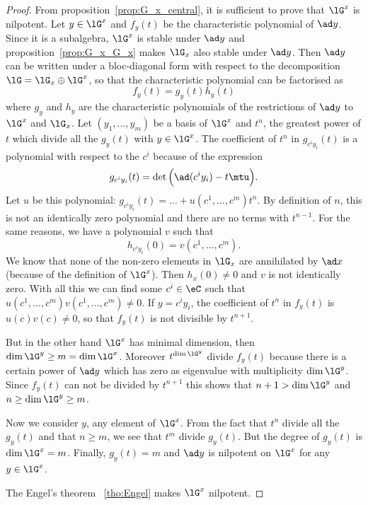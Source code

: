 \begin{proof}
	From proposition~\ref{prop:G_x_central}, it is sufficient to prove that $\lG^x$ is nilpotent. Let $y\in\lG^x$ and $f_y(t)$ be the characteristic polynomial of $\ad y$. Since it is a subalgebra, $\lG^x$ is stable under $\ad y$ and proposition~\ref{prop:G_x_G_x} makes $\lG_x$ also stable under $\ad y$. Then $\ad y$ can be written under a bloc-diagonal form with respect to the decomposition $\lG=\lG_x\oplus\lG^x$, so that the characteristic polynomial can be factorised as
	\begin{equation}
		f_y(t)=g_y(t)h_y(t)
	\end{equation}
	where $g_y$ and $h_y$ are the characteristic polynomials of the restrictions of $\ad y$ to $\lG^x$ and $\lG_x$. Let $(y_1,\ldots,y_m)$ be a basis of $\lG^x$ and $t^n$, the greatest power of $t$ which divide all the $g_y(t)$ with $y\in\lG^x$. The coefficient of $t^n$ in $g_{c^iy_i}(t)$ is a polynomial with respect to the $c^i$ because of the expression
	\[
		g_{c^iy_i}(t)=\det\Big( \ad(c^iy_i)-t\mtu \Big).
	\]
	Let $u$ be this polynomial: $g_{c^iy_i}(t)=\ldots+u(c^1,\ldots,c^m)t^n$. By definition of $n$, this is not an identically zero polynomial and there are no terms with $t^{n-1}$. For the same reasons, we have a polynomial $v$ such that
	\begin{equation}
		h_{c^iy_i}(0)=v(c^1,\ldots,c^m).
	\end{equation}
	We know that none of the non-zero elements in $\lG_x$ are annihilated by $\ad x$ (because of the definition of $\lG^x$). Then $h_x(0)\neq 0$ and $v$ is not identically zero. With all this we can find some $c^i\in\eC$ such that $u(c^1,\ldots,c^m)v(c^1,\ldots,c^m)\neq 0$. If $y=c^iy_i$, the coefficient of $t^n$ in $f_y(t)$ is $u(c)v(c)\neq 0$, so that $f_y(t)$ is not divisible by $t^{n+1}$.

	But in the other hand $\lG^x$ has minimal dimension, then $\dim\lG^y\geq m=\dim\lG^x$. Moreover $t^{\dim\lG^y}$ divide $f_y(t)$ because there is a certain power of $\ad y$ which has zero as eigenvalue with multiplicity $\dim\lG^y$. Since $f_y(t)$ can not be divided by $t^{n+1}$ this shows that $n+1>\dim\lG^y$ and $n\geq\dim\lG^y\geq m$.

	Now we consider $y$, any element of $\lG^x$. From the fact that $t^n$ divide all the $g_y(t)$ and that $n\geq m$, we see that $t^m$ divide $g_y(t)$. But the degree of $g_y(t)$ is $\dim\lG^x=m$. Finally, $g_y(t)=m$ and $\ad y$ is nilpotent on $\lG^x$ for any $y\in\lG^x$.

	The Engel's theorem ~\ref{tho:Engel} makes $\lG^x$ nilpotent.
\end{proof}


